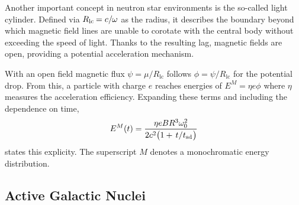 Another important concept in neutron star environments is the so-called light cylinder. Defined via
$R_\text{lc} \kern-0.6pt = c / \kern-0.4pt \omega$ as the radius, it describes the boundary beyond which magnetic field lines
are unable to corotate with the central body without exceeding the speed of light. Thanks to the resulting lag, magnetic fields
are open, providing a potential acceleration mechanism.

With an open field magnetic flux $\psi = \mu / R_\text{lc}$ follows $\phi = \psi / R_\text{lc}$ for the potential drop. From
this, a particle with charge $e$ reaches energies of $E^M = \eta e \phi$ where $\eta$ measures the acceleration efficiency.
Expanding these terms and including the dependence on time,
\begin{equation}
	E^M(t) = \frac{\eta e B R^3 \omega_0^2}{2c^2 \bigl( 1 + \kern+1.5pt t \kern+0.1pt / \kern+0.2pt t_\text{sd} \kern+0.5pt \bigr)}
	\label{eqn:mono}
\end{equation}
states this explicity. The superscript $M$ denotes a monochromatic energy distribution.



\subsection{Active Galactic Nuclei}
\label{sub:nuclei}

